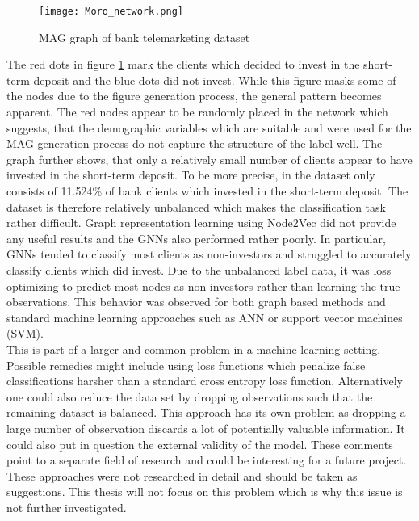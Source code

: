 	\begin{figure}[h]
		\centering
		\texttt{[image: Moro\_network.png]}
		\caption{MAG graph of bank telemarketing dataset}
        \label{fig:Moro}
	\end{figure}
  
  \noindent The red dots in figure \ref{fig:Moro} mark the clients which
  decided to invest in the short-term deposit and the blue dots did not invest.
  While this figure masks some of the nodes due to the figure generation
  process, the general pattern becomes apparent. The red nodes appear to be 
  randomly placed in the network which suggests, that the demographic variables 
  which are suitable and were used for the MAG generation process do not
  capture the structure of the label well. The graph further shows, that only a
  relatively small number of clients appear to have invested in the short-term
  deposit. To be more precise, in the dataset only consists of 11.524\% of bank
  clients which invested in the short-term deposit. The dataset is therefore 
  relatively unbalanced which makes the classification task rather difficult. 
  Graph representation learning using Node2Vec did not provide any useful 
  results and the GNNs also performed rather poorly. In particular, GNNs tended
  to classify most clients as non-investors and struggled to accurately
  classify clients which did invest. Due to the unbalanced label data, it was
  loss optimizing to predict most nodes as non-investors rather than learning
  the true observations. This behavior was observed for both graph based
  methods and standard machine learning approaches such as ANN or support
  vector machines (SVM). \\

  \noindent This is part of a larger and common problem in a machine learning 
  setting. Possible remedies might include using loss functions which penalize 
  false classifications harsher than a standard cross entropy loss function. 
  Alternatively one could also reduce the data set by dropping observations
  such that the remaining dataset is balanced. This approach has its own
  problem as dropping a large number of observation discards a lot of
  potentially valuable information. It could also put in question the external
  validity of the model. These comments point to a separate field of research
  and could be interesting for a future project. These approaches were not
  researched in detail and should be taken as suggestions. This thesis will not
  focus on this problem which is why this issue is not further investigated. \\

